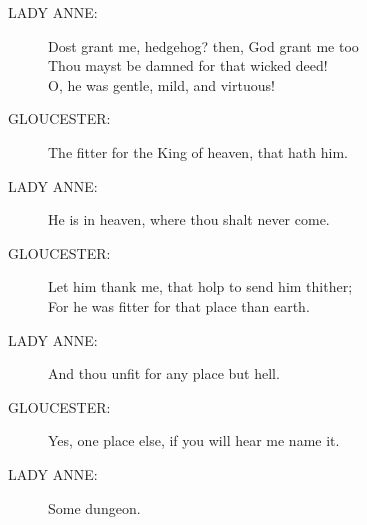 \documentclass{article}
\begin{document}
\begin{description}
\item[LADY ANNE:] 
\hspace{1pt}Dost grant me, hedgehog? then, God grant me too\\
\hspace{1pt}Thou mayst be damned for that wicked deed!\\
\hspace{1pt}O, he was gentle, mild, and virtuous!\\
\end{description}
\begin{description}
\item[GLOUCESTER:] 
\hspace{1pt}The fitter for the King of heaven, that hath him.\\
\end{description}
\begin{description}
\item[LADY ANNE:] 
\hspace{1pt}He is in heaven, where thou shalt never come.\\
\end{description}
\begin{description}
\item[GLOUCESTER:] 
\hspace{1pt}Let him thank me, that holp to send him thither;\\
\hspace{1pt}For he was fitter for that place than earth.\\
\end{description}
\begin{description}
\item[LADY ANNE:] 
\hspace{1pt}And thou unfit for any place but hell.\\
\end{description}
\begin{description}
\item[GLOUCESTER:] 
\hspace{1pt}Yes, one place else, if you will hear me name it.\\
\end{description}
\begin{description}
\item[LADY ANNE:] 
\hspace{1pt}Some dungeon.\\
\end{description}
\end{document}
